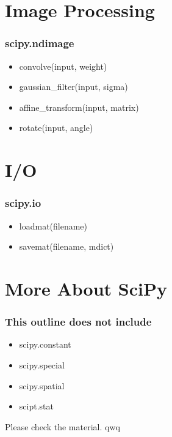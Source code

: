 \documentclass[english, nochinese]{beamer}
\begin{document}
\section{Image Processing}
\begin{frame}
\frametitle{scipy.ndimage}
\begin{itemize}
\item convolve(input, weight)
\item gaussian\_filter(input, sigma)
\item affine\_transform(input, matrix)
\item rotate(input, angle)
\end{itemize}
\end{frame}

\section{I/O}
\begin{frame}
\frametitle{scipy.io}
\begin{itemize}
\item loadmat(filename)
\item savemat(filename, mdict)
\end{itemize}
\end{frame}

\section{More About SciPy}
\begin{frame}
\frametitle{This outline does not include}
\begin{itemize}
\item scipy.constant
\item scipy.special
\item scipy.spatial
\item scipt.stat
\end{itemize}
Please check the material. qwq
\end{frame}
\end{document}
